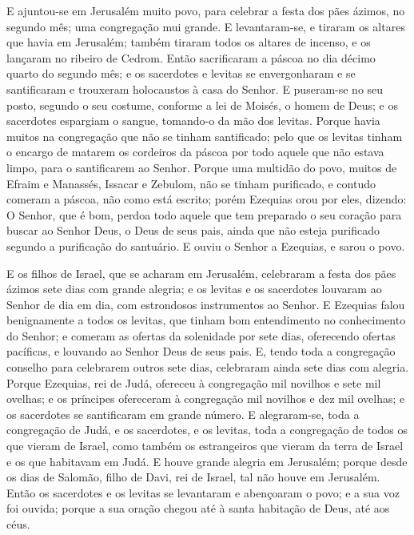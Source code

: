 E ajuntou-se em Jerusalém muito povo, para celebrar a festa dos
pães ázimos, no segundo mês; uma congregação mui grande. E
levantaram-se, e tiraram os altares que havia em Jerusalém; também
tiraram todos os altares de incenso, e os lançaram no ribeiro de
Cedrom. Então sacrificaram a páscoa no dia décimo quarto do
segundo mês; e os sacerdotes e levitas se envergonharam e se
santificaram e trouxeram holocaustos à casa do Senhor. E
puseram-se no seu posto, segundo o seu costume, conforme a lei de
Moisés, o homem de Deus; e os sacerdotes espargiam o sangue,
tomando-o da mão dos levitas. Porque havia muitos na
congregação que não se tinham santificado; pelo que os levitas
tinham o encargo de matarem os cordeiros da páscoa por todo aquele
que não estava limpo, para o santificarem ao Senhor. Porque
uma multidão do povo, muitos de Efraim e Manassés, Issacar e
Zebulom, não se tinham purificado, e contudo comeram a páscoa, não
como está escrito; porém Ezequias orou por eles, dizendo: O Senhor,
que é bom, perdoa todo aquele que tem preparado o seu coração
para buscar ao Senhor Deus, o Deus de seus pais, ainda que não
esteja purificado segundo a purificação do santuário. E ouviu
o Senhor a Ezequias, e sarou o povo.

E os filhos de Israel, que se acharam em Jerusalém, celebraram a
festa dos pães ázimos sete dias com grande alegria; e os levitas e
os sacerdotes louvaram ao Senhor de dia em dia, com estrondosos
instrumentos ao Senhor. E Ezequias falou benignamente a todos
os levitas, que tinham bom entendimento no conhecimento do Senhor; e
comeram as ofertas da solenidade por sete dias, oferecendo ofertas
pacíficas, e louvando ao Senhor Deus de seus pais. E, tendo
toda a congregação conselho para celebrarem outros sete dias,
celebraram ainda sete dias com alegria. Porque Ezequias, rei
de Judá, ofereceu à congregação mil novilhos e sete mil ovelhas; e
os príncipes ofereceram à congregação mil novilhos e dez mil
ovelhas; e os sacerdotes se santificaram em grande número. E
alegraram-se, toda a congregação de Judá, e os sacerdotes, e os
levitas, toda a congregação de todos os que vieram de Israel, como
também os estrangeiros que vieram da terra de Israel e os que
habitavam em Judá. E houve grande alegria em Jerusalém;
porque desde os dias de Salomão, filho de Davi, rei de Israel, tal
não houve em Jerusalém. Então os sacerdotes e os levitas se
levantaram e abençoaram o povo; e a sua voz foi ouvida; porque a sua
oração chegou até à santa habitação de Deus, até aos céus.

\medskip


